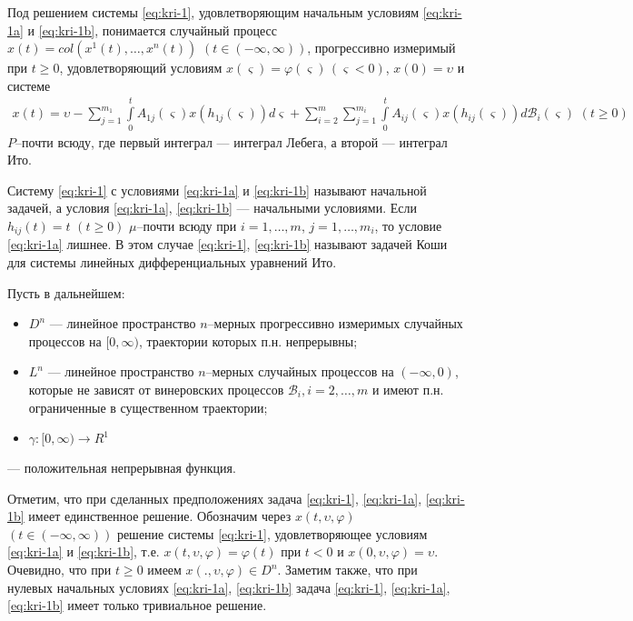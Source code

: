 \begin{definition}\label{def:kri-1}
    Под решением системы \eqref{eq:kri-1}, удовлетворяющим
    начальным условиям \eqref{eq:kri-1a} и \eqref{eq:kri-1b}, понимается случайный процесс $x(t) =
    col (x^1(t), \dots, x^n(t))$ $ (t \in (-\infty , \infty))$,
    прогрессивно измеримый при  $t \ge 0$, удовлетворяющий условиям
    $x(\varsigma)=\varphi (\varsigma) {\,} (\varsigma < 0)$, $x(0) =
    \upsilon$ и системе
    $$
    \begin {array}{crl}
     x(t) =   \upsilon - \sum \limits_{j=1}^{m_1}\int \limits _0^t A_{1j}(\varsigma)x(h_{1j}(\varsigma))d\varsigma
     + \sum \limits_{i=2}^m\sum
    \limits_{j=1}^{m_i}\int \limits
     _0^t A_{ij}(\varsigma)x(h_{ij}(\varsigma))d\mathcal B_i(\varsigma)
     \,\, (t \ge 0)
    \end {array}
    $$
    $P$--почти всюду, где первый интеграл --- интеграл Лебега, а второй
    --- интеграл Ито.
\end{definition}

Систему \eqref{eq:kri-1} с условиями \eqref{eq:kri-1a} и \eqref{eq:kri-1b} называют начальной задачей, а
условия \eqref{eq:kri-1a}, \eqref{eq:kri-1b} --- начальными условиями. Если $h_{ij}(t) = t$
$(t \geq 0)$  $\mu $--почти всюду при $i = 1,\dots,m$, $j =
1,\dots,m_i$, то условие \eqref{eq:kri-1a} лишнее. В этом случае \eqref{eq:kri-1}, \eqref{eq:kri-1b} называют
задачей Коши для системы линейных дифференциальных уравнений Ито.

Пусть в дальнейшем:
\begin{itemize}
    \item $D^n$ --- линейное пространство $n$--мерных прогрессивно измеримых
    случайных процессов на $[0, \infty )$, траектории которых п.н.
    непрерывны;

    \item $L^n$ --- линейное пространство $n$--мерных случайных процессов на
    $(-\infty , 0)$, которые не зависят от винеровских процессов
    $\mathcal B_i, i = 2, \dots, m$ и имеют п.н. ограниченные в
    существенном траектории;

    \item $\gamma :[0, \infty) \rightarrow R^1 $
\end{itemize}
--- положительная непрерывная функция.

Отметим, что при сделанных предположениях задача \eqref{eq:kri-1}, \eqref{eq:kri-1a}, \eqref{eq:kri-1b}
имеет единственное решение. Обозначим через $x(t, \upsilon,
\varphi)$ $(t \in (-\infty , \infty ))$ решение системы \eqref{eq:kri-1},
удовлетворяющее условиям \eqref{eq:kri-1a} и \eqref{eq:kri-1b}, т.е. $x(t, \upsilon, \varphi )
= \varphi (t)$ при $t < 0$ и $x(0, \upsilon, \varphi ) = \upsilon$.
Очевидно, что при $t \ge 0$ имеем $x(., \upsilon, \varphi) \in D^n$.
Заметим также, что при нулевых начальных условиях \eqref{eq:kri-1a}, \eqref{eq:kri-1b} задача
\eqref{eq:kri-1}, \eqref{eq:kri-1a}, \eqref{eq:kri-1b} имеет только тривиальное решение.


